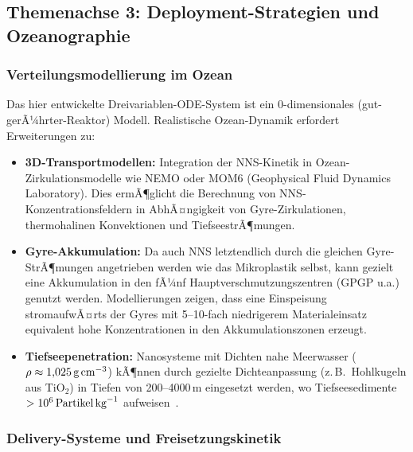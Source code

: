 ﻿\documentclass[12pt,a4paper]{article}
\theoremstyle{definition}
\theoremstyle{remark}
\begin{document}
\subsection{Themenachse 3: Deployment-Strategien und Ozeanographie}

\subsubsection{Verteilungsmodellierung im Ozean}

Das hier entwickelte Dreivariablen-ODE-System ist ein 0-dimensionales
(gut-gerÃ¼hrter-Reaktor) Modell. Realistische Ozean-Dynamik erfordert
Erweiterungen zu:

\begin{itemize}
  \item \textbf{3D-Transportmodellen:} Integration der NNS-Kinetik in
        Ozean-Zirkulationsmodelle wie NEMO oder MOM6 (Geophysical Fluid
        Dynamics Laboratory). Dies ermÃ¶glicht die Berechnung von
        NNS-Konzentrationsfeldern in AbhÃ¤ngigkeit von Gyre-Zirkulationen,
        thermohalinen Konvektionen und TiefseestrÃ¶mungen.
  \item \textbf{Gyre-Akkumulation:} Da auch NNS letztendlich durch die gleichen
        Gyre-StrÃ¶mungen angetrieben werden wie das Mikroplastik selbst,
        kann gezielt eine Akkumulation in den fÃ¼nf Hauptverschmutzungszentren
        (GPGP u.a.) genutzt werden. Modellierungen zeigen, dass eine
        Einspeisung stromaufwÃ¤rts der Gyres mit 5--10-fach niedrigerem
        Materialeinsatz equivalent hohe Konzentrationen in den Akkumulationszonen
        erzeugt.
  \item \textbf{Tiefseepenetration:} Nano\-systeme mit Dichten nahe Meerwasser
        ($\rho \approx 1{,}025\,\text{g\,cm}^{-3}$) kÃ¶nnen durch gezielte
        Dichteanpassung (z.\,B.\ Hohlkugeln aus TiO$_2$) in Tiefen von
        200--4000\,m eingesetzt werden, wo Tiefseesedimente
        $> 10^6\,\text{Partikel\,kg}^{-1}$ aufweisen~\cite{peng2018microplastics}.
\end{itemize}

\subsubsection{Delivery-Systeme und Freisetzungskinetik}
\end{document}
